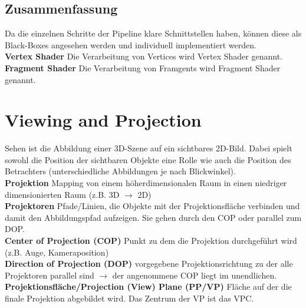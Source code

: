 \documentclass[12pt]{article}
\begin{document}
	\subsection{Zusammenfassung}
	Da die einzelnen Schritte der Pipeline klare Schnittstellen haben, können diese als Black-Boxes angesehen werden und individuell implementiert werden.\\
	\textbf{Vertex Shader} Die Verarbeitung von Vertices wird Vertex Shader genannt.\\
	\textbf{Fragment Shader} Die Verarbeitung von Framgents wird Fragment Shader genannt.

	\section{Viewing and Projection}
	Sehen ist die Abbildung einer 3D-Szene auf ein sichtbares 2D-Bild. Dabei spielt sowohl die Position der sichtbaren Objekte eine Rolle wie auch die Position des Betrachters (unterschiedliche Abbildungen je nach Blickwinkel).\\
	\textbf{Projektion} Mapping von einem höherdimensionalen Raum in einen niedriger dimensionierten Raum (z.B. 3D $\rightarrow$ 2D)\\
	\textbf{Projektoren} Pfade/Linien, die Objekte mit der Projektionsfläche verbinden und damit den Abbildungspfad aufzeigen. Sie gehen durch den COP oder parallel zum DOP.\\
	\textbf{Center of Projection (COP)} Punkt zu dem die Projektion durchgeführt wird (z.B. Auge, Kameraposition)\\
	\textbf{Direction of Projection (DOP)} vorgegebene Projektionsrichtung zu der alle Projektoren parallel sind $\rightarrow$ der angenommene COP liegt im unendlichen.\\
	\textbf{Projektionsfläche/Projection (View) Plane (PP/VP)} Fläche auf der die finale Projektion abgebildet wird. Das Zentrum der VP ist das VPC.
\end{document}
